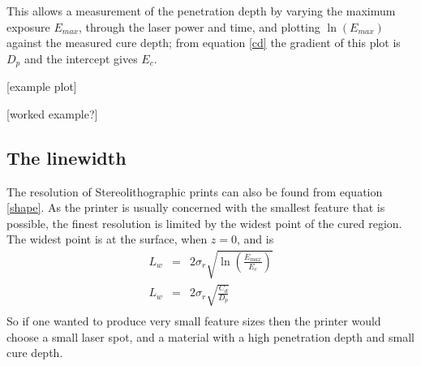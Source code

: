This allows a measurement of the penetration depth by varying the maximum exposure $E_{max}$, through the laser power and time, and plotting $\ln \left( E_{max} \right)$ against the measured cure depth; from equation \ref{cd} the gradient of this plot is $D_{p}$ and the intercept gives $E_{c}$. 

[example plot]

[worked example?]

\subsection{The linewidth}

The resolution of Stereolithographic prints can also be found from equation \ref{shape}. As the printer is usually concerned with the smallest feature that is possible, the finest resolution is limited by the widest point of the cured region. The widest point is at the surface, when $z=0$, and is 
\begin{eqnarray}
L_{w} & = & 2 \sigma_{r} \sqrt{ \ln \left( \frac{ E_{max}}{E_{c} } \right) } \\
L_{w} & = & 2 \sigma_{r} \sqrt{ \frac{C_{d}}{D_{p}} } \\
\label{lw}
\end{eqnarray}
So if one wanted to produce very small feature sizes then the printer would choose a small laser spot, and a material with a high penetration depth and small cure depth. 








